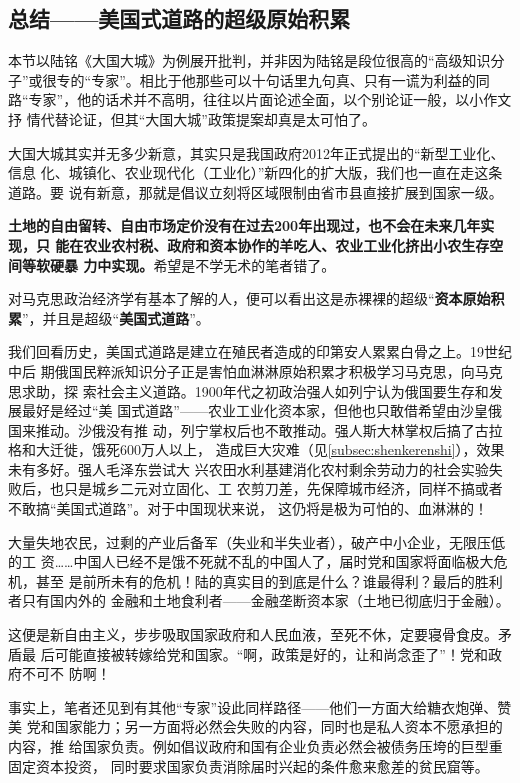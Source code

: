 \subsection{总结——美国式道路的超级原始积累}


本节以陆铭《大国大城》为例展开批判，并非因为陆铭是段位很高的“高级知识分
子”或很专的“专家”。相比于他那些可以十句话里九句真、只有一谎为利益的同
路“专家”，他的话术并不高明，往往以片面论述全面，以个别论证一般，以小作文抒
情代替论证，但其“大国大城”政策提案却真是太可怕了。

大国大城其实并无多少新意，其实只是我国政府2012年正式提出的“新型工业化、信息
化、城镇化、农业现代化（工业化）”新四化的扩大版，我们也一直在走这条道路。要
说有新意，那就是倡议立刻将区域限制由省市县直接扩展到国家一级。

\textbf{土地的自由留转、自由市场定价没有在过去200年出现过，也不会在未来几年实现，只
  能在农业农村税、政府和资本协作的羊吃人、农业工业化挤出小农生存空间等软硬暴
  力中实现。}希望是不学无术的笔者错了。

对马克思政治经济学有基本了解的人，便可以看出这是赤裸裸的超级“\textbf{资本原始积
累}”，并且是超级“\textbf{美国式道路}”。

我们回看历史，美国式道路是建立在殖民者造成的印第安人累累白骨之上。19世纪中后
期俄国民粹派知识分子正是害怕血淋淋原始积累才积极学习马克思，向马克思求助，探
索社会主义道路。1900年代之初政治强人如列宁认为俄国要生存和发展最好是经过“美
国式道路”——农业工业化资本家，但他也只敢借希望由沙皇俄国来推动。沙俄没有推
动，列宁掌权后也不敢推动。强人斯大林掌权后搞了古拉格和大迁徙，饿死600万人以上，
造成巨大灾难（见\cref{subsec:shenkerenshi}），效果未有多好。强人毛泽东尝试大
兴农田水利基建消化农村剩余劳动力的社会实验失败后，也只是城乡二元对立固化、工
农剪刀差，先保障城市经济，同样不搞或者不敢搞“美国式道路”。对于中国现状来说，
这仍将是极为可怕的、血淋淋的！

大量失地农民，过剩的产业后备军（失业和半失业者），破产中小企业，无限压低的工
资……中国人已经不是饿不死就不乱的中国人了，届时党和国家将面临极大危机，甚至
是前所未有的危机！陆的真实目的到底是什么？谁最得利？最后的胜利者只有国内外的
金融和土地食利者——金融垄断资本家（土地已彻底归于金融）。

这便是新自由主义，步步吸取国家政府和人民血液，至死不休，定要寝骨食皮。矛盾最
后可能直接被转嫁给党和国家。“啊，政策是好的，让和尚念歪了”！党和政府不可不
防啊！

事实上，笔者还见到有其他“专家”设此同样路径——他们一方面大给糖衣炮弹、赞美
党和国家能力；另一方面将必然会失败的内容，同时也是私人资本不愿承担的内容，推
给国家负责。例如倡议政府和国有企业负责必然会被债务压垮的巨型重固定资本投资，
同时要求国家负责消除届时兴起的条件愈来愈差的贫民窟等。

